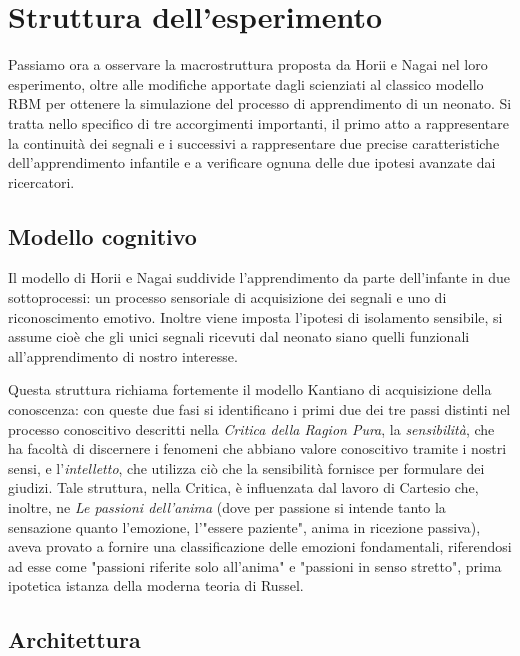 \documentclass[10pt,letterpaper]{article}
\begin{document}
\newpage
\section{Struttura dell'esperimento}

Passiamo ora a osservare la macrostruttura proposta da Horii e Nagai nel loro esperimento, oltre alle modifiche apportate dagli scienziati al classico modello RBM per ottenere la simulazione del processo di apprendimento di un neonato. Si tratta nello specifico di tre accorgimenti importanti, il primo atto a rappresentare la continuità dei segnali e i successivi a rappresentare due precise caratteristiche dell'apprendimento infantile e a verificare ognuna delle due ipotesi avanzate dai ricercatori.

\subsection{Modello cognitivo}

Il modello di Horii e Nagai suddivide l'apprendimento da parte dell'infante in due sottoprocessi: un processo sensoriale di acquisizione dei segnali e uno di riconoscimento emotivo. Inoltre viene imposta l'ipotesi di isolamento sensibile, si assume cioè che gli unici segnali ricevuti dal neonato siano quelli funzionali all'apprendimento di nostro interesse.

Questa struttura richiama fortemente il modello Kantiano di acquisizione della conoscenza: con queste due fasi si identificano i primi due dei tre passi distinti nel processo conoscitivo descritti nella \textit{Critica della Ragion Pura}, la \textit{sensibilità}, che ha facoltà di discernere i fenomeni che abbiano valore conoscitivo tramite i nostri sensi, e l'\textit{intelletto}, che utilizza ciò che la sensibilità fornisce per formulare dei giudizi. Tale struttura, nella Critica, è influenzata dal lavoro di Cartesio che, inoltre, ne \textit{Le passioni dell'anima} (dove per passione si intende tanto la sensazione quanto l'emozione, l'"essere paziente", anima in ricezione passiva), aveva provato a fornire una classificazione delle emozioni fondamentali, riferendosi ad esse come "passioni riferite solo all'anima" e "passioni in senso stretto", prima ipotetica istanza della moderna teoria di Russel.

\subsection{Architettura}
\end{document}
